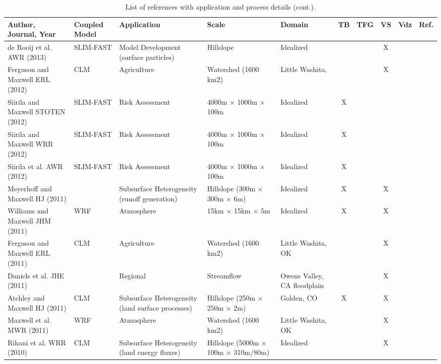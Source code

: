 {\begin{table} \center
\renewcommand{\arraystretch}{2.5}
\center
\caption{List of \parflow{} references with application and process details (cont.).}

\begin{tabular}{ l  p{1.5cm} p{2cm} p{1.5cm} p{1.5cm} | c | c | c | c | c }
\bf{Author, Journal, Year} & \bf{Coupled Model} & \bf{Application} & \bf{Scale} & \bf{Domain} & \bf{TB} & \bf{TFG} & \bf{VS} & \bf{Vdz} & \bf{Ref.} \\   
\hline{}
   
de Rooij et al. AWR (2013) & SLIM-FAST & Model Development (surface particles) & Hillslope & Idealized  &  &  & X & & \cite{deRooij13}   \\
Ferguson and Maxwell ERL (2012) & CLM & Agriculture & Watershed (1600 km2) & Little Washita,  &  &  & X & & \cite{Ferguson12} \\
Siirila and Maxwell STOTEN (2012) & SLIM-FAST & Risk Assessment & 4000m × 1000m × 100m & Idealized  & X &  &  & & \cite{Siirila12c} \\
Siirila and Maxwell WRR (2012) & SLIM-FAST & Risk Assessment & 4000m × 1000m × 100m & Idealized  & X &  &  & & \cite{Siirila12b}  \\
Siirila et al. AWR (2012) & SLIM-FAST & Risk Assessment & 4000m × 1000m × 100m & Idealized  & X &  &  & & \cite{Condon13b} \\
Meyerhoff and Maxwell HJ (2011) & & Subsurface Heterogeneity (runoff generation) & Hillslope (300m × 300m × 6m) & Idealized  & X &  & X & & \cite{Meyerhoff11} \\
Williams and Maxwell JHM (2011) & WRF & Atmosphere & 15km × 15km × 5m & Idealized & X &  & X & & \cite{Williams11}  \\
Ferguson and Maxwell ERL (2011) & CLM & Agriculture & Watershed (1600 km2) & Little Washita, OK  &  &  & X & & \cite{Ferguson11}  \\
Daniels et al. JHE (2011) & & Regional & Streamflow & Owens Valley, CA floodplain  &  &  & X & & \cite{Daniels11}  \\
Atchley and Maxwell HJ (2011) & CLM & Subsurface Heterogeneity (land surface processes) & Hillslope (250m × 250m × 2m) &Golden, CO  & X &  & X & & \cite{Atchely11}  \\
Maxwell et al. MWR (2011) & WRF & Atmosphere & Watershed (1600 km2) & Little Washita, OK  &  &  & X & & \cite{Maxwell11} \\
Rihani et al. WRR (2010) & CLM & Subsurface Heterogeneity (land energy fluxes) & Hillslope (5000m × 100m × 310m/80m) & Idealized  &  &  & X & & \cite{Rihani10}  \\
\end{tabular}
\label{pfref2}
\end{table}

}
